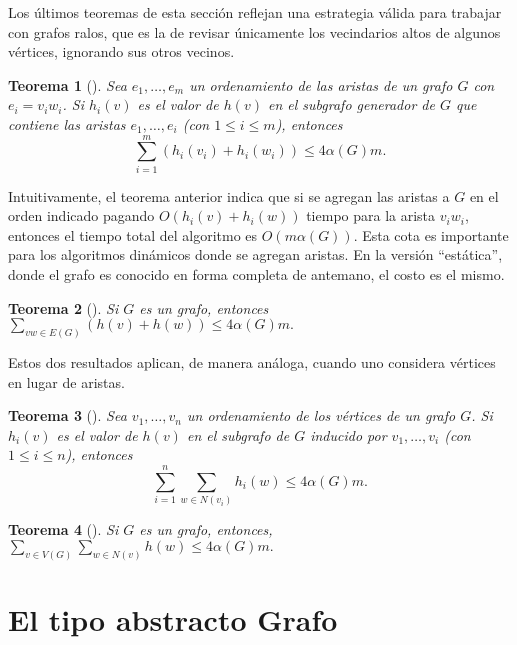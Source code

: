 \documentclass[%
    a4paper,%
    fontsize=12pt,%
    DIV=12,
    twoside,%
    openright,%
    titlepage=true,%
    headsepline,%
    toc=bibliography,%
    parskip=half,%
    cleardoublepage=empty,%
    headings=big,%
]{scrbook}
\newtheorem{theorem}{Teorema}
\begin{document}
Los últimos teoremas de esta sección reflejan una estrategia válida para trabajar con grafos ralos, que es la de revisar únicamente los vecindarios altos de algunos vértices, ignorando sus otros vecinos.

\begin{theorem}[\cite{LinSoulignacSzwarcfiterTCS2012}]
 Sea $e_1, \ldots, e_m$ un ordenamiento de las aristas de un grafo $G$ con $e_i = v_iw_i$.  Si $h_i(v)$ es el valor de $h(v)$ en el subgrafo generador de $G$ que contiene las aristas $e_1, \ldots, e_i$ (con $1 \leq i \leq m$), entonces
 \[\displaystyle \sum_{i=1}^{m}(h_i(v_i)+h_i(w_i)) \leq 4\alpha(G)m.\]
\end{theorem}

Intuitivamente, el teorema anterior indica que si se agregan las aristas a $G$ en el orden indicado pagando $O(h_i(v)+h_i(w))$ tiempo para la arista $v_iw_i$, entonces el tiempo total del algoritmo es $O(m\alpha(G))$.  Esta cota es importante para los algoritmos dinámicos donde se agregan aristas.  En la versión ``estática'', donde el grafo es conocido en forma completa de antemano, el costo es el mismo.

\begin{theorem}[\cite{LinSoulignacSzwarcfiterTCS2012}]
  Si $G$ es un grafo, entonces $\displaystyle \sum_{vw \in E(G)}(h(v)+h(w)) \leq 4\alpha(G)m.$
\end{theorem}

Estos dos resultados aplican, de manera análoga, cuando uno considera vértices en lugar de aristas.

\begin{theorem}[\cite{LinSoulignacSzwarcfiterTCS2012}]
 Sea $v_1, \ldots, v_n$ un ordenamiento de los vértices de un grafo $G$.  Si $h_i(v)$ es el valor de $h(v)$ en el subgrafo de $G$ inducido por $v_1, \ldots, v_i$ (con $1 \leq i \leq n$), entonces
  \[\displaystyle \sum_{i=1}^{n}\sum_{w \in N(v_i)}h_i(w) \leq 4\alpha(G)m.\]
\end{theorem}
%
\begin{theorem}[\cite{LinSoulignacSzwarcfiterTCS2012}]
  Si $G$ es un grafo, entonces, $\displaystyle \sum_{v \in V(G)}\sum_{w \in N(v)}h(w) \leq 4\alpha(G)m.$
\end{theorem}



\chapter{El tipo abstracto Grafo}
\label{sec:tad grafo}
\end{document}
